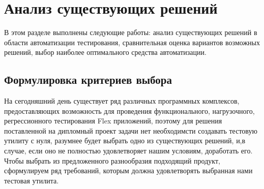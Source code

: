 \chapter{Анализ существующих решений}

В этом разделе выполнены следующие работы: анализ существующих решений в области
автоматизации тестирования, сравнительная оценка вариантов возможных решений, выбор
наиболее оптимального средства автоматизации.

\section{Формулировка критериев выбора}
 
На сегодняшний день существует ряд различных программных комплексов, предоставляющих
возможность для проведения функционального, нагрузочного, регрессионного 
тестирования Flex приложений, поэтому для решения поставленной на дипломный
проект задачи нет необходимсти создавать тестовую утилиту с нуля, разумнее 
будет выбрать одно из существующих решений, и,в случае, если оно не полностью 
удовлетворяет нашим условиям, доработать его. Чтобы выбрать из предложенного 
разнообразия подходящий продукт, сформулируем ряд требований, 
которым должна удовлетворять выбранная нами тестовая утилита.

